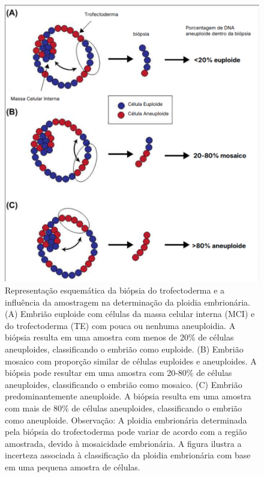 \begin{figure}[h]
    \captionsetup{font=footnotesize, position=above}
    \label{fig:biopsiaPGT-A}
    \centering
    \includegraphics[scale=0.6]{figuras/biopsiaPGT-A.pdf}
    \vspace{0.3cm} 
    \begin{minipage}{\linewidth}
        \centering
        \caption{Representação esquemática da biópsia do trofectoderma e a influência da amostragem na determinação da ploidia embrionária. (A) Embrião euploide com células da massa celular interna (MCI) e do trofectoderma (TE) com pouca ou nenhuma aneuploidia. A biópsia resulta em uma amostra com menos de 20\% de células aneuploides, classificando o embrião como euploide. (B) Embrião mosaico com proporção similar de células euploides e aneuploides. A biópsia pode resultar em uma amostra com 20-80\% de células aneuploides, classificando o embrião como mosaico. (C) Embrião predominantemente aneuploide. A biópsia resulta em uma amostra com mais de 80\% de células aneuploides, classificando o embrião como aneuploide. Observação: A ploidia embrionária determinada pela biópsia do trofectoderma pode variar de acordo com a região amostrada, devido à mosaicidade embrionária. A figura ilustra a incerteza associada à classificação da ploidia embrionária com base em uma pequena amostra de células.}

\end{minipage}
\end{figure}
